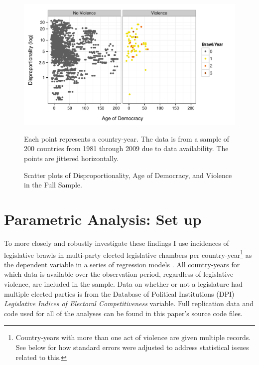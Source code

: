 \documentclass[a4paper]{article}\usepackage[]{graphicx}\usepackage[]{color}
\newenvironment{knitrout}{}{} %
\begin{document}
\begin{figure}[t]
    \caption{Scatter plots of Disproportionality, Age of Democracy, and Violence in the Full Sample.}
    \label{framework_empirical}
    \begin{center}

\begin{knitrout}
\color{fgcolor}
\includegraphics[width=0.8\linewidth]{figure/FrameworkEmpirical-1} 

\end{knitrout}
    \end{center}
    \begin{singlespace}
        {\scriptsize{Each point represents a country-year. The data is from a sample of 200 countries from 1981 through 2009 due to data availability. The points are jittered horizontally.}}
    \end{singlespace}

\end{figure}



\section{Parametric Analysis: Set up}

To more closely and robustly investigate these findings I use incidences of legislative brawls in multi-party elected legislative chambers per country-year\footnote{Country-years with more than one act of violence are given multiple records. See below for how standard errors were adjusted to address statistical issues related to this.} as the dependent variable in a series of regression models \citep{KingRareEvents2001, KingRareEventsPA2001}. All country-years for which data is available over the observation period, regardless of legislative violence, are included in the sample. Data on whether or not a legislature had multiple elected parties is from the Database of Political Institutions (DPI) \citep[updated to 2010]{DPI2001} {\emph{Legislative Indices of Electoral Competitiveness}} variable. Full replication data and code used for all of the analyses can be found in this paper's source code files.
\end{document}

